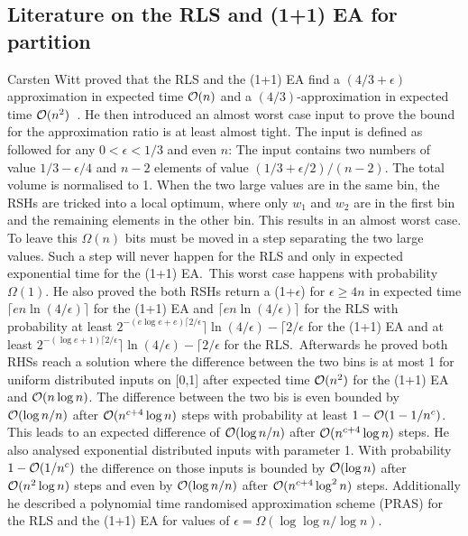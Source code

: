\subsection{Literature on the RLS and (1+1) EA for partition}
Carsten Witt proved that the RLS and the (1+1) EA find a $(4/3+\epsilon)$ approximation in expected time $\mathcal{O}(n)$ and a $(4/3)$-approximation in expected time $\mathcal{O}(n^2)$~\cite{witt2005worst}.
He then introduced an almost worst case input to prove the bound for the approximation ratio is at least almost tight.
The input is defined as followed for any $0<\epsilon<1/3$ and even $n$:\newline
The input contains two numbers of value $1/3 - \epsilon/4$ and $n-2$ elements of value $(1/3+\epsilon/2)/(n-2)$. 
The total volume is normalised to 1.
When the two large values are in the same bin, the RSHs are tricked into a local optimum, where only $w_1$ and $w_2$ are in the first bin and the remaining elements in the other bin.
This results in an almost worst case.
To leave this $\Omega(n)$ bits must be moved in a step separating the two large values.
Such a step will never happen for the RLS and only in expected exponential time for the (1+1) EA.\
This worst case happens with probability $\Omega(1)$.
He also proved the both RSHs return a (1+$\epsilon$) for $\epsilon\ge4n$ in expected time \(\lceil en\ln(4/\epsilon)\rceil\) for the (1+1) EA and \(\lceil en\ln(4/\epsilon)\rceil\) for the RLS with probability at least \(2^{-(e\log{e}+e)\lceil 2/\epsilon}\rceil \ln(4/\epsilon)-\lceil 2/\epsilon\) for the (1+1) EA and at least \(2^{-(\log{e}+1)\lceil 2/\epsilon}\rceil \ln(4/\epsilon)-\lceil 2/\epsilon\) for the RLS.\
Afterwards he proved both RHSs reach a solution where the difference between the two bins is at most 1 for uniform distributed inputs on [0,1] after expected time $\mathcal{O}(n^2)$ for the (1+1) EA and $\mathcal{O}(n\log{n})$.
The difference between the two bis is even bounded by $\mathcal{O}(\log{n}/n)$ after $\mathcal{O}(n^{c+4}\log{n})$ steps with probability at least $1-\mathcal{O}(1-1/n^c)$.
This leads to an expected difference of $\mathcal{O}(\log{n}/n)$ after $\mathcal{O}(n^{c+4}\log{n})$ steps.
He also analysed exponential distributed inputs with parameter 1.
With probability $1-\mathcal{O}(1/n^c)$ the difference on those inputs is bounded by $\mathcal{O}(\log{n})$ after $\mathcal{O}(n^2\log{n})$ steps and even by $\mathcal{O}(\log{n}/n)$ after $\mathcal{O}(n^{c+4}\log^2{n})$ steps.
Additionally he described a polynomial time randomised approximation scheme (PRAS) for the RLS and the (1+1) EA for values of $\epsilon=\Omega(\log{\log{}}n/\log{n})$.\newline
